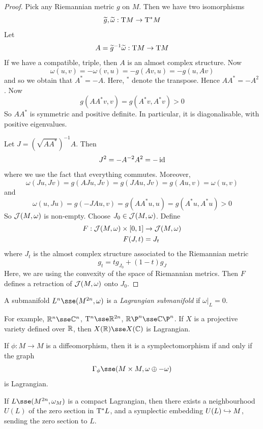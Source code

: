 \documentclass{article}
\begin{document}
\begin{proof}
    Pick any Riemannian metric \(g\) on \(M\). Then we have two isomorphisms
    \[\widetilde g, \widetilde \omega : \mathrm{T} M \to \mathrm{T}^* M\]
    Let
    \[A = \widetilde g^{-1}\widetilde \omega : \mathrm{T} M \to \mathrm{T} M\]
    If we have a compatible, triple, then \(A\) is an almost complex structure. Now
    \[\omega(u, v) = -\omega(v, u) = -g(Av, u) = -g(u, Av)\]
    and so we obtain that \(A^* = -A\). Here, \(^*\) denote the transpose. Hence \(AA^* = -A^2\). Now
    \[g(AA^*v, v) = g(A^*v, A^*v) > 0\]
    So \(AA^*\) is symmetric and positive definite. In particular, it is diagonalisable, with positive eigenvalues.

    Let \(J = \left(\sqrt{AA^*}\right)^{-1}A\). Then
    \[J^2 = -A^{-2}A^2 = -\operatorname{id}\]
    where we use the fact that everything commutes. Moreover,
    \[\omega(Ju, Jv) = g(AJu, Jv) = g(JAu, Jv) = g(Au, v) = \omega(u, v)\]
    and
    \[\omega(u, Ju) = g(-JAu, v) = g(AA^*u, u) = g(A^*u, A^*u) > 0\]
    So \(\mathcal{J}(M, \omega)\) is non-empty. Choose \(J_0 \in \mathcal{J}(M, \omega)\). Define
    \begin{align*}
        F : \mathcal{J}(M, \omega) \times [0, 1] &\to \mathcal{J}(M, \omega) \\
        F(J, t) &= J_t
    \end{align*}
    where \(J_t\) is the almost complex structure associated to the Riemannian metric
    \[g_t = tg_{J_0} + (1 - t)g_J\]
    Here, we are using the convexity of the space of Riemannian metrics. Then \(F\) defines a retraction of \(\mathcal{J}(M, \omega)\) onto \(J_0\).
\end{proof}

\begin{definition}
    A submanifold \(L^n \sse (M^{2n}, \omega)\) is a \emph{Lagrangian submanifold} if \(\omega\vert_L = 0\).
\end{definition}

For example, \(\R^n \sse \C^n\), \(\T^n \sse \R^{2n}\), \(\R\P^n \sse \C\P^n\). If \(X\) is a projective variety defined over \(\mathbb{R}\), then \(X(\R) \sse X(\C)\) is Lagrangian.

\begin{example}
    If \(\phi : M \to M\) is a diffeomorphism, then it is a symplectomorphism if and only if the graph
    \[\Gamma_\phi \sse (M \times M, \omega \oplus -\omega)\]
    is Lagrangian.
\end{example}

\begin{theorem}

    If \(L \sse (M^{2n}, \omega_M)\) is a compact Lagrangian, then there exists a neighbourhood \(U(L)\) of the zero section in \(\mathrm{T}^*L\), and a symplectic embedding \(U(L) \hookrightarrow M\), sending the zero section to \(L\).
\end{theorem}
\end{document}
